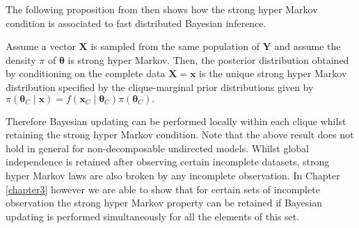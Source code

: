 The following proposition from \citet{Dawid1993} then shows how the strong hyper Markov condition is associated to fast distributed Bayesian inference.
\begin{proposition}
\label{prop:markovupdating}
Assume a vector $\bm{X}$ is sampled from the same population of $\bm{Y}$ and assume the density $\pi$ of $\bm{\theta}$ is strong hyper Markov. Then, the posterior distribution obtained by conditioning on the complete data $\bm{X}=\bm{x}$ is the unique strong hyper Markov distribution specified by the clique-marginal prior distributions given by $
\pi(\bm{\theta}_C\;|\; \bm{x})=f(\bm{x}_C\;|\;\bm{\theta}_C)\pi(\bm{\theta}_C).$
\end{proposition}
Therefore Bayesian updating can be performed locally within each clique whilst retaining the strong hyper Markov condition. Note that  the above result does not hold in general for non-decomposable undirected models. Whilst global independence is retained after observing certain incomplete datasets, strong hyper Markov laws are also broken by any incomplete observation. In Chapter \ref{chapter3} however we are able to show that for certain sets of incomplete observation the strong hyper Markov property can be retained if Bayesian updating is performed simultaneously for all the elements of this set.

